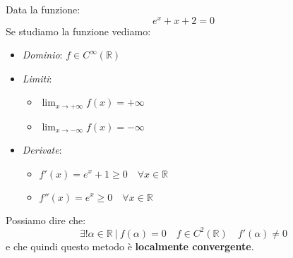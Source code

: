 \begin{example}
	\label{example:conv_quad}
	Data la funzione:
	\begin{equation*}
		e^x+x+2=0
	\end{equation*}
	Se studiamo la funzione vediamo:
	\begin{itemize}
		\item \textit{Dominio}: $f \in C^\infty(\mathbb{R})$
		\item \textit{Limiti}:
		\begin{itemize}
			\item $\lim_{x \to + \infty}f(x) = + \infty$
			\item $\lim_{x \to - \infty}f(x) = - \infty$
		\end{itemize}
		\item \textit{Derivate}:
		\begin{itemize}
			\item $f'(x) = e^x+1 \geq 0 \quad \forall x \in \mathbb{R}$
			\item $f''(x) = e^x \geq 0 \quad \forall x \in \mathbb{R}$
		\end{itemize}
	\end{itemize}
	\begin{center}
	\end{center}
	Possiamo dire che:
	\begin{equation*}
		\exists ! \alpha \in \mathbb{R} \:\vert\: f(\alpha)=0 \quad f \in C^2(\mathbb{R}) \quad f'(\alpha)\neq 0
	\end{equation*}
	e che quindi questo metodo è \textbf{localmente convergente}.
\end{example}

